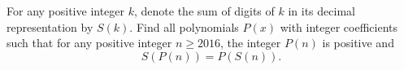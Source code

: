 For any positive integer $k$, denote the sum of digits of $k$ in its decimal representation by $S(k)$. Find all polynomials $P(x)$ with integer coefficients such that for any positive integer $n \geq 2016$, the integer $P(n)$ is positive and
\[
S(P(n)) = P(S(n)).
\]

